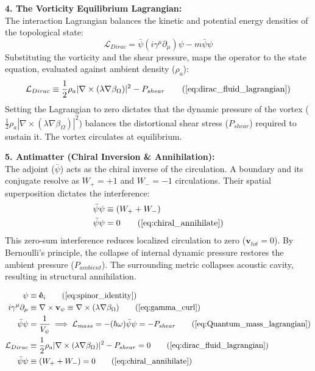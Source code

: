 \textbf{4. The Vorticity Equilibrium Lagrangian:} \\
The interaction Lagrangian balances the kinetic and potential energy densities of the topological state: 
\begin{equation}
    \mathcal{L}_{Dirac} = \bar{\psi} (i\gamma^\mu \partial_\mu) \psi - m\bar{\psi}\psi \nonumber
\end{equation}
Substituting the vorticity and the shear pressure, maps the operator to the state equation, evaluated against ambient density ($\rho_a$):
\begin{equation}
    \mathcal{L}_{Dirac} \equiv \frac{1}{2}\rho_a |\nabla \times (\lambda \nabla \beta_\Omega)|^2 - P_{shear} \tag{\ref{eq:dirac_fluid_lagrangian}}
\end{equation}
Setting the Lagrangian to zero dictates that the dynamic pressure of the vortex ($\frac{1}{2}\rho_a |\nabla \times (\lambda \nabla \beta_\Omega)|^2$) balances the distortional shear stress ($P_{shear}$) required to sustain it. The vortex circulates at equilibrium. 

\textbf{5. Antimatter (Chiral Inversion \& Annihilation):} \\
The adjoint ($\bar{\psi}$) acts as the chiral inverse of the circulation. A boundary and its conjugate resolve as $W_+ = +1$ and $W_- = -1$ circulations. Their spatial superposition dictates the interference: 
\begin{align}
    \bar{\psi}\psi &\equiv (W_+ + W_-) \nonumber \\
    \bar{\psi}\psi &= 0 \tag{\ref{eq:chiral_annihilate}}
\end{align}
This zero-sum interference reduces localized circulation to zero ($\mathbf{v}_{tot} = 0$). By Bernoulli's principle, the collapse of internal dynamic pressure restores the ambient pressure ($P_{ambient}$). The surrounding metric collapses acoustic cavity, resulting in structural annihilation. 

\begin{tcolorbox}[recallbox, title={\ref{box:dirac_isomorphism}. Topological Vorticity Equilibrium (The Dirac Isomorphism)}]
\begin{align}
    \psi &\equiv \mathbf{\hat{e}}_i \tag{\ref{eq:spinor_identity}} \\
    i\gamma^\mu \partial_\mu &\equiv \nabla \times \mathbf{v}_\psi \equiv \nabla \times (\lambda \nabla \beta_\Omega) \tag{\ref{eq:gamma_curl}} \\
    \bar{\psi} \psi &= \frac{1}{V_{\psi}} \implies \mathcal{L}_{mass} = - (\hbar \omega) \bar{\psi}\psi = - P_{shear} \tag{\ref{eq:Quantum_mass_lagrangian}} \\
    \mathcal{L}_{Dirac} &\equiv \frac{1}{2}\rho_a |\nabla \times (\lambda \nabla \beta_\Omega)|^2 - P_{shear} = 0 \tag{\ref{eq:dirac_fluid_lagrangian}} \\
    \bar{\psi}\psi &\equiv (W_+ + W_-) = 0 \tag{\ref{eq:chiral_annihilate}} 
\end{align}
\end{tcolorbox}


